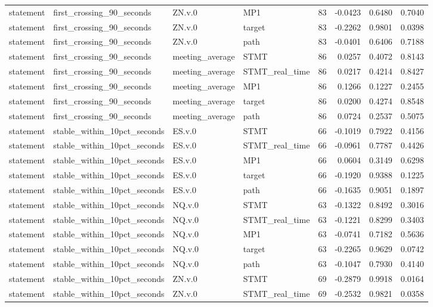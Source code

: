 \begin{tabular}{llllrrrr}
statement & first_crossing_90_seconds & ZN.v.0 & MP1 & 83 & -0.0423 & 0.6480 & 0.7040 \\
statement & first_crossing_90_seconds & ZN.v.0 & target & 83 & -0.2262 & 0.9801 & 0.0398 \\
statement & first_crossing_90_seconds & ZN.v.0 & path & 83 & -0.0401 & 0.6406 & 0.7188 \\
statement & first_crossing_90_seconds & meeting_average & STMT & 86 & 0.0257 & 0.4072 & 0.8143 \\
statement & first_crossing_90_seconds & meeting_average & STMT_real_time & 86 & 0.0217 & 0.4214 & 0.8427 \\
statement & first_crossing_90_seconds & meeting_average & MP1 & 86 & 0.1266 & 0.1227 & 0.2455 \\
statement & first_crossing_90_seconds & meeting_average & target & 86 & 0.0200 & 0.4274 & 0.8548 \\
statement & first_crossing_90_seconds & meeting_average & path & 86 & 0.0724 & 0.2537 & 0.5075 \\
statement & stable_within_10pct_seconds & ES.v.0 & STMT & 66 & -0.1019 & 0.7922 & 0.4156 \\
statement & stable_within_10pct_seconds & ES.v.0 & STMT_real_time & 66 & -0.0961 & 0.7787 & 0.4426 \\
statement & stable_within_10pct_seconds & ES.v.0 & MP1 & 66 & 0.0604 & 0.3149 & 0.6298 \\
statement & stable_within_10pct_seconds & ES.v.0 & target & 66 & -0.1920 & 0.9388 & 0.1225 \\
statement & stable_within_10pct_seconds & ES.v.0 & path & 66 & -0.1635 & 0.9051 & 0.1897 \\
statement & stable_within_10pct_seconds & NQ.v.0 & STMT & 63 & -0.1322 & 0.8492 & 0.3016 \\
statement & stable_within_10pct_seconds & NQ.v.0 & STMT_real_time & 63 & -0.1221 & 0.8299 & 0.3403 \\
statement & stable_within_10pct_seconds & NQ.v.0 & MP1 & 63 & -0.0741 & 0.7182 & 0.5636 \\
statement & stable_within_10pct_seconds & NQ.v.0 & target & 63 & -0.2265 & 0.9629 & 0.0742 \\
statement & stable_within_10pct_seconds & NQ.v.0 & path & 63 & -0.1047 & 0.7930 & 0.4140 \\
statement & stable_within_10pct_seconds & ZN.v.0 & STMT & 69 & -0.2879 & 0.9918 & 0.0164 \\
statement & stable_within_10pct_seconds & ZN.v.0 & STMT_real_time & 69 & -0.2532 & 0.9821 & 0.0358 \\

\end{tabular}
